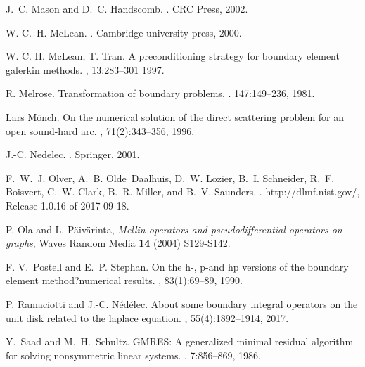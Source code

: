 \documentclass[a4paper]{subfiles}
\begin{document}
\begin{thebibliography}{10}
J.~C. Mason and D.~C. Handscomb.
.
\newblock CRC Press, 2002.

W. C.~H. McLean.
.
\newblock Cambridge university press, 2000.

{W. C. H. McLean, T. Tran}.
\newblock A preconditioning strategy for boundary element galerkin methods.
, 13:283--301 1997.

 R. Melrose. Transformation of boundary problems. . 147:149--236, 1981.


Lars M{\"o}nch.
\newblock On the numerical solution of the direct scattering problem for an
  open sound-hard arc.
,
  71(2):343--356, 1996.

J.-C. Nedelec. . \newblock Springer, 2001.

F.~W.~J. Olver, A.~B. Olde~Daalhuis, D.~W. Lozier, B.~I. Schneider, R.~F.
  Boisvert, C.~W. Clark, B.~R. Miller, and B.~V. Saunders.
.
\newblock http://dlmf.nist.gov/, Release 1.0.16 of 2017-09-18.

 P. Ola and L. P\"aiv\"arinta, {\em Mellin operators and pseudodifferential operators on graphs}, Waves Random Media {\bf 14} (2004) S129-S142.

F. V.~Postell and E.~P. Stephan.
\newblock On the h-, p-and hp versions of the boundary element
  method?numerical results.
,
  83(1):69--89, 1990.

P. Ramaciotti and J.-C. N{\'e}d{\'e}lec.
\newblock About some boundary integral operators on the unit disk related to
  the laplace equation.
, 55(4):1892--1914, 2017.

 Y.~Saad and M.~H.~Schultz. 
\newblock GMRES: A generalized minimal residual algorithm for solving nonsymmetric linear systems.
, 7:856--869, 1986.


\end{thebibliography}
\end{document}
